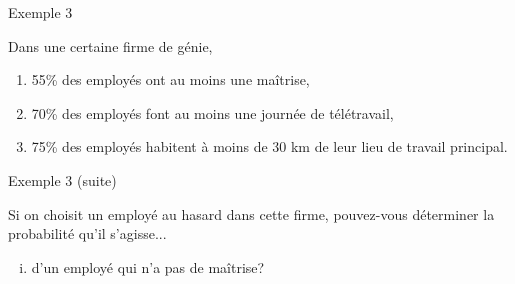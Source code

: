 \documentclass{BeamerTemplate}
\begin{document}

\begin{frame}[t]{Exemple 3}

\small
 Dans une certaine firme de génie,
 \begin{enumerate}[$\bullet$]
 \item 55\% des employés ont au moins une maîtrise,
 \item 70\% des employés font au moins une journée de télétravail,
 \item 75\% des employés habitent à moins de 30 km de leur lieu de travail principal.
 \end{enumerate}
 

\end{frame}

 \begin{frame}[t]{Exemple 3 (suite)}
 \small{
 Si on choisit un employé au hasard dans cette firme, pouvez-vous déterminer la probabilité qu'il s'agisse...
  \begin{enumerate}[(i)]\itemsep.8cm
 \item d'un employé qui n'a pas de maîtrise? %

 \end{enumerate}
}
\end{frame}
\end{document}

